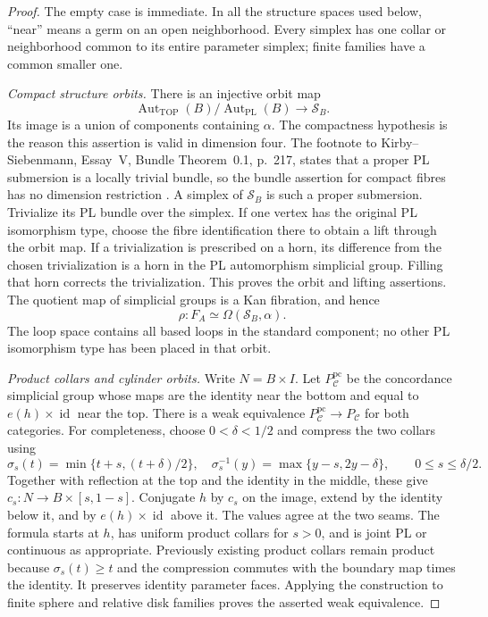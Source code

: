 \begin{proof}
The empty case is immediate.  In all the structure spaces used below,
``near'' means a germ on an open neighborhood.  Every simplex has
one collar or neighborhood common to its entire parameter simplex;
finite families have a common smaller one.

\emph{Compact structure orbits.}
There is an injective orbit map
\[
 \operatorname{Aut}_{\mathrm{TOP}}(B)/
 \operatorname{Aut}_{\mathrm{PL}}(B)\longrightarrow\mathcal S_B.
\]
Its image is a union of components containing $\alpha$.  The
compactness hypothesis is the reason this assertion is valid in
dimension four.  The footnote to Kirby--Siebenmann, Essay~V,
Bundle Theorem~0.1, p.~217, states that a proper PL submersion is a
locally trivial bundle, so the bundle assertion for compact fibres
has no dimension restriction \cite{KirbySiebenmann1977}.
A simplex of $\mathcal S_B$ is such a proper submersion.  Trivialize
its PL bundle over the simplex.  If one vertex has the original PL
isomorphism type, choose the fibre identification there to obtain
a lift through the orbit map.  If a trivialization is prescribed on
a horn, its difference from the chosen trivialization is a horn in
the PL automorphism simplicial group.  Filling that horn corrects
the trivialization.  This proves the orbit and lifting assertions.
The quotient map of simplicial groups is a Kan fibration, and hence
\begin{equation}\label{eq:compact-four-orbit-loop}
 \rho:F_A\simeq\Omega(\mathcal S_B,\alpha).
\end{equation}
The loop space contains all based loops in the standard component;
no other PL isomorphism type has been placed in that orbit.

\emph{Product collars and cylinder orbits.}
Write $N=B\times I$.  Let $P_{\mathcal C}^{\mathrm{pc}}$ be the
concordance simplicial group whose maps are the identity near the
bottom and equal to $e(h)\times\operatorname{id}$ near the top.
There is a weak equivalence
$P_{\mathcal C}^{\mathrm{pc}}\to P_{\mathcal C}$ for both categories.
For completeness, choose $0<\delta<1/2$ and compress the two collars
using
\[
 \sigma_s(t)=\min\{t+s,(t+\delta)/2\},\quad
 \sigma_s^{-1}(y)=\max\{y-s,2y-\delta\},
 \qquad 0\leq s\leq\delta/2.
\]
Together with reflection at the top and the identity in the middle,
these give $c_s:N\to B\times[s,1-s]$.  Conjugate $h$ by $c_s$ on
the image, extend by the identity below it, and by
$e(h)\times\operatorname{id}$ above it.  The values agree at the
two seams.  The formula starts at $h$, has uniform product collars
for $s>0$, and is joint PL or continuous as appropriate.  Previously
existing product collars remain product because $\sigma_s(t)\geq t$
and the compression commutes with the boundary map times the
identity.  It preserves identity parameter faces.  Applying the
construction to finite sphere and relative disk families proves
the asserted weak equivalence.


\end{proof}
